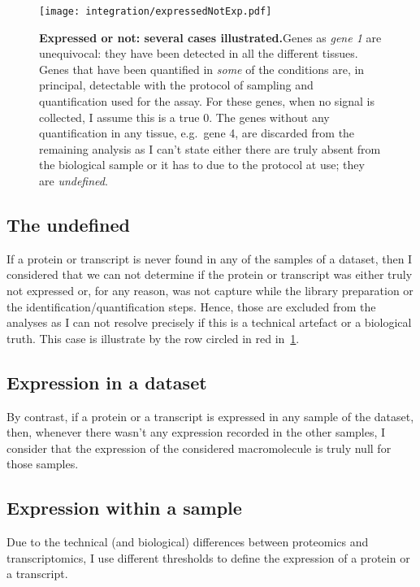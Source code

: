 \begin{figure}[!htbp]
\texttt{[image: integration/expressedNotExp.pdf]}\centering
    \caption[Expressed or not: several cases illustrated]
    {\label{fig:DefineExpression}\textbf{Expressed or not: several cases
    illustrated.}\smallbreak{}Genes as \emph{gene 1} are unequivocal: they have been
    detected in all the different tissues. Genes that have been quantified in
    \emph{some} of the conditions are, in principal, detectable with the
    protocol of sampling and quantification used for the assay.
    For these genes, when no signal is collected, I assume this is a true $0$.
    The genes without any quantification
    in any tissue, e.g.\ gene 4, are discarded from the remaining analysis as
    I can't state
    either there are truly absent from the biological sample or it has to due
    to the protocol at use; they are \emph{undefined}.}
\end{figure}

\subsection{The undefined}
\label{subsec:IntegrationExpressedOrNot-undefined}
If a protein or transcript is never found in any of the samples of a dataset,
then I considered that we can not determine if the protein or transcript was
either truly not expressed or, for any reason, was not capture while the library
preparation or the identification/quantification steps. Hence, those are
excluded from the analyses as I can not resolve precisely if this is a
technical artefact or a biological truth. This case is illustrate by the row
circled in red in~\cref{fig:DefineExpression}.

\subsection{Expression in a dataset}
\label{subsec:IntegrationExpressedOrNot--expDataset}
By contrast, if a protein or a transcript is expressed in any sample of the
dataset, then, whenever there wasn't any expression recorded in the other
samples, I consider that the expression of the considered macromolecule is truly
null for those samples.

\subsection{Expression within a sample}
Due to the technical (and biological) differences between proteomics and
transcriptomics, I use different thresholds to define the expression of a protein
or a transcript.

